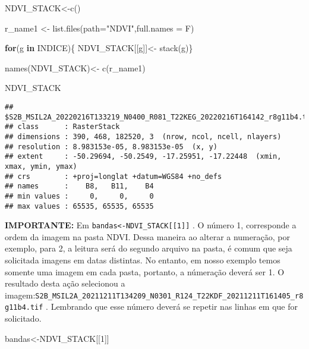\documentclass[
]{article}
\newenvironment{Shaded}{\begin{snugshade}}{\end{snugshade}}
\newcommand{\AttributeTok}[1]{\textcolor[rgb]{0.77,0.63,0.00}{#1}}
\newcommand{\ControlFlowTok}[1]{\textcolor[rgb]{0.13,0.29,0.53}{\textbf{#1}}}
\newcommand{\DecValTok}[1]{\textcolor[rgb]{0.00,0.00,0.81}{#1}}
\newcommand{\FunctionTok}[1]{\textcolor[rgb]{0.00,0.00,0.00}{#1}}
\newcommand{\NormalTok}[1]{#1}
\newcommand{\OtherTok}[1]{\textcolor[rgb]{0.56,0.35,0.01}{#1}}
\newcommand{\StringTok}[1]{\textcolor[rgb]{0.31,0.60,0.02}{#1}}
\begin{document}
\begin{Shaded}
\begin{Highlighting}[]
\NormalTok{NDVI\_STACK}\OtherTok{\textless{}{-}}\FunctionTok{c}\NormalTok{() }

\NormalTok{r\_name1 }\OtherTok{\textless{}{-}} \FunctionTok{list.files}\NormalTok{(}\AttributeTok{path=}\StringTok{"NDVI"}\NormalTok{,}\AttributeTok{full.names =}\NormalTok{ F)}

\ControlFlowTok{for}\NormalTok{(g }\ControlFlowTok{in}\NormalTok{ INDICE)\{ }
\NormalTok{  NDVI\_STACK[[g]]}\OtherTok{\textless{}{-}} \FunctionTok{stack}\NormalTok{(g)\} }


\FunctionTok{names}\NormalTok{(NDVI\_STACK)}\OtherTok{\textless{}{-}} \FunctionTok{c}\NormalTok{(r\_name1)}

\NormalTok{NDVI\_STACK}
\end{Highlighting}
\end{Shaded}

\begin{verbatim}
## $S2B_MSIL2A_20220216T133219_N0400_R081_T22KEG_20220216T164142_r8g11b4.tif
## class      : RasterStack 
## dimensions : 390, 468, 182520, 3  (nrow, ncol, ncell, nlayers)
## resolution : 8.983153e-05, 8.983153e-05  (x, y)
## extent     : -50.29694, -50.2549, -17.25951, -17.22448  (xmin, xmax, ymin, ymax)
## crs        : +proj=longlat +datum=WGS84 +no_defs 
## names      :    B8,   B11,    B4 
## min values :     0,     0,     0 
## max values : 65535, 65535, 65535
\end{verbatim}

\textbf{IMPORTANTE:} Em
\texttt{bandas\textless{}-NDVI\_STACK{[}{[}1{]}{]}} . O número 1,
corresponde a ordem da imagem na pasta NDVI. Dessa maneira ao alterar a
numeração, por exemplo, para 2, a leitura será do segundo arquivo na
pasta, é comum que seja solicitada imagens em datas distintas. No
entanto, em nosso exemplo temos somente uma imagem em cada pasta,
portanto, a númeração deverá ser 1. O resultado desta ação selecionou a
imagem:\texttt{S2B\_MSIL2A\_20211211T134209\_N0301\_R124\_T22KDF\_20211211T161405\_r8g11b4.tif}
. Lembrando que esse número deverá se repetir nas linhas em que for
solicitado.

\begin{Shaded}
\begin{Highlighting}[]
\NormalTok{bandas}\OtherTok{\textless{}{-}}\NormalTok{NDVI\_STACK[[}\DecValTok{1}\NormalTok{]]}
\end{Highlighting}
\end{Shaded}
\end{document}
